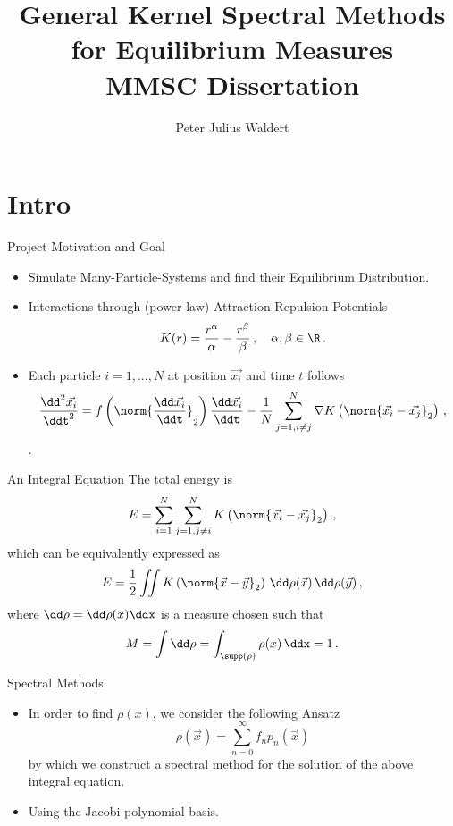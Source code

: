 \documentclass[aspectratio=169,hyperref={colorlinks=true}]{beamer}
\title{General Kernel Spectral Methods for Equilibrium Measures \\ \normalsize MMSC Dissertation}
\author{Peter Julius Waldert}
\institute{Mathematical Institute \\ University of Oxford}
\date{} %
\begin{document}
  {\frame{\titlepage}}

  \section{Intro}
  \begin{frame}{Project Motivation and Goal}
    \begin{itemize}
      \item Simulate Many-Particle-Systems and find their Equilibrium Distribution.
      \item Interactions through (power-law) Attraction-Repulsion Potentials
            $$K(r) = \frac{r^\alpha}{\alpha} - \frac{r^\beta}{\beta}\,,\quad \alpha, \beta \in \R\,.$$
      \item Each particle $i=1, ..., N$ at position $\vec{x_i}$ and time $t$ follows
            $$\frac{\dd^2 \vec{x_i}}{\ddt^2} = f\left(\norm{\frac{\dd \vec{x_i}}{\ddt}}_2\right) \frac{\dd\vec{x_i}}{\ddt} - \frac{1}{N} \sum_{j=1, i\neq j}^{N} \nabla K\left(\norm{\vec{x_i} - \vec{x_j}}_2\right)\,,$$
            \parencite{2020-power-law-kernels, 2021-arbitrary-dimensions}.
    \end{itemize}
  \end{frame}

  \begin{frame}{An Integral Equation}
    The total energy is $$E = \sum_{i=1}^{N} \sum_{j=1, j \neq i}^{N} K\left(\norm{\vec{x_i} - \vec{x_j}}_2\right)\,,$$
    which can be equivalently expressed as
    $$E = \frac{1}{2} \iint K\left(\norm{\vec{x} - \vec{y}}_2\right) \,\dd\rho(\vec{x})\,\dd\rho(\vec{y})\,,$$ where $\dd\rho = \dd\rho(x)\ddx$ is a measure chosen such that $$M = \int \dd\rho = \int_{\supp(\rho)} \rho(x) \,\ddx = 1\,.$$
  \end{frame}

  \begin{frame}{Spectral Methods}
    \begin{itemize}
      \item In order to find $\rho(x)$, we consider the following Ansatz
            $$\rho(\vec{x}) = \sum_{n=0}^{\infty} f_n p_n(\vec{x})$$
            by which we construct a spectral method for the solution of the above integral equation.
      \item Using the Jacobi polynomial basis.
    \end{itemize}
  \end{frame}
\end{document}
